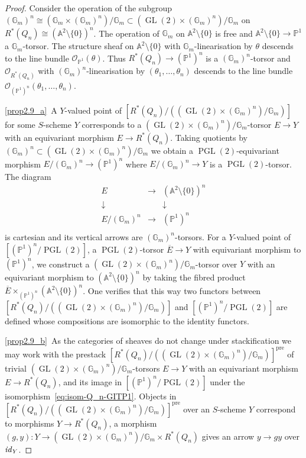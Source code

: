 \documentclass[ALCO,ThmDefs,Unicode,epreuves]{cedram}
\def\id{{\it id}}
\def\A{\mathds A}
\def\G{\mathds G}
\def\P{\mathds P}
\def\O{\mathcal O}
\DeclareMathOperator{\GL}{GL}
\DeclareMathOperator{\PGL}{PGL}
\begin{document}
\begin{proof}
Consider the operation of the subgroup $(\G_m)^n\cong(\G_m\times(\G_m)^n)/\G_m
\subset(\GL(2)\times(\G_m)^n)/\G_m$ on $R^*(Q_n)\cong(\A^2\setminus\{0\})^n$.
The operation of $\G_m$ on $\A^2\setminus\{0\}$ is free and $\A^2\setminus\{0\}\to\P^1$
a $\G_m$-torsor. 
The structure sheaf on $\A^2\setminus\{0\}$ with $\G_m$-linearisation by $\theta$ 
descends to the line bundle $\O_{\P^1}(\theta)$. Thus $R^*(Q_n)\to(\P^1)^n$ is a 
$(\G_m)^n$-torsor and $\O_{R^*(Q_n)}$ with $(\G_m)^n$-linearisation by 
$(\theta_1,\ldots,\theta_n)$ descends to the line bundle 
$\O_{(\P^1)^n}(\theta_1,\ldots,\theta_n)$. %

\ref{prop2.9_a}~A $Y$-valued point of $[R^*(Q_n)/((\GL(2)\times(\G_m)^n)/\G_m)]$ for some 
$S$-scheme $Y$ corresponds to a $(\GL(2)\times(\G_m)^n)/\G_m$-torsor
$E\to Y$ with an equivariant morphism $E\to R^*(Q_n)$.
Taking quotients by $(\G_m)^n\subset (\GL(2)\times(\G_m)^n)/\G_m$ 
we obtain a $\PGL(2)$-equivariant morphism $E/(\G_m)^n\to(\P^1)^n$
where $E/(\G_m)^n\to Y$ is a $\PGL(2)$-torsor. The diagram
\[
\begin{array}{ccc}
E&\longrightarrow&(\A^2\setminus\{0\})^n\\
\downarrow&&\downarrow\\
E/(\G_m)^n&\longrightarrow&(\P^1)^n\\
\end{array}
\]
is cartesian and its vertical arrows are $(\G_m)^n$-torsors. For a $Y$-valued point of 
$[(\P^1)^n/\PGL(2)]$, a $\PGL(2)$-torsor $\overline{E}\to Y$ with equivariant morphism
to $(\P^1)^n$, we construct a $(\GL(2)\times(\G_m)^n)/\G_m$-torsor over $Y$ with an 
equivariant morphism to $(\A^2\setminus\{0\})^n$ by taking the fibred product 
$\overline{E}\times_{(\P^1)^n}(\A^2\setminus\{0\})^n$.
One verifies that this way two functors between
$[R^*(Q_n)/((\GL(2)\times(\G_m)^n)/\G_m)]$ and $[(\P^1)^n/\PGL(2)]$
are defined whose compositions are isomorphic to the identity functors.

\ref{prop2.9_b}~As the categories of sheaves do not change under stackification we may work with 
the prestack $[R^*(Q_n)/((\GL(2)\times(\G_m)^n)/\G_m)]^\text{pre}$ of trivial 
$(\GL(2)\times(\G_m)^n)/\G_m$-torsors $E\to Y$ with an equivariant morphism 
$E\to R^*(Q_n)$, and its image in $[(\P^1)^n/\PGL(2)]$ under the isomorphism~\eqref{eq:isom-Q_n-GITP1}. 
Objects in $[R^*(Q_n)/((\GL(2)\times(\G_m)^n)/\G_m)]^\text{pre}$ over an 
$S$-scheme $Y$ correspond to morphisms $Y\to R^*(Q_n)$, a morphism 
$(g,y)\colon Y\to (\GL(2)\times(\G_m)^n)/\G_m\times R^*(Q_n)$ gives an arrow 
$y\to gy$ over $\id_Y$.


\end{proof}
\end{document}
